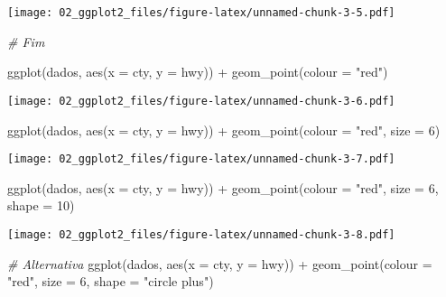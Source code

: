 \documentclass[
]{book}
\newenvironment{Shaded}{\begin{snugshade}}{\end{snugshade}}
\newcommand{\AttributeTok}[1]{\textcolor[rgb]{0.77,0.63,0.00}{#1}}
\newcommand{\CommentTok}[1]{\textcolor[rgb]{0.56,0.35,0.01}{\textit{#1}}}
\newcommand{\DecValTok}[1]{\textcolor[rgb]{0.00,0.00,0.81}{#1}}
\newcommand{\FunctionTok}[1]{\textcolor[rgb]{0.00,0.00,0.00}{#1}}
\newcommand{\NormalTok}[1]{#1}
\newcommand{\SpecialCharTok}[1]{\textcolor[rgb]{0.00,0.00,0.00}{#1}}
\newcommand{\StringTok}[1]{\textcolor[rgb]{0.31,0.60,0.02}{#1}}
\begin{document}
\texttt{[image: 02\_ggplot2\_files/figure-latex/unnamed-chunk-3-5.pdf]}

\begin{Shaded}
\begin{Highlighting}[]
\CommentTok{\# Fim }

\FunctionTok{ggplot}\NormalTok{(dados, }\FunctionTok{aes}\NormalTok{(}\AttributeTok{x =}\NormalTok{ cty, }\AttributeTok{y =}\NormalTok{ hwy)) }\SpecialCharTok{+} 
  \FunctionTok{geom\_point}\NormalTok{(}\AttributeTok{colour =} \StringTok{"red"}\NormalTok{)}
\end{Highlighting}
\end{Shaded}

\texttt{[image: 02\_ggplot2\_files/figure-latex/unnamed-chunk-3-6.pdf]}

\begin{Shaded}
\begin{Highlighting}[]
\FunctionTok{ggplot}\NormalTok{(dados, }\FunctionTok{aes}\NormalTok{(}\AttributeTok{x =}\NormalTok{ cty, }\AttributeTok{y =}\NormalTok{ hwy)) }\SpecialCharTok{+} 
  \FunctionTok{geom\_point}\NormalTok{(}\AttributeTok{colour =} \StringTok{"red"}\NormalTok{, }\AttributeTok{size =} \DecValTok{6}\NormalTok{)}
\end{Highlighting}
\end{Shaded}

\texttt{[image: 02\_ggplot2\_files/figure-latex/unnamed-chunk-3-7.pdf]}

\begin{Shaded}
\begin{Highlighting}[]
\FunctionTok{ggplot}\NormalTok{(dados, }\FunctionTok{aes}\NormalTok{(}\AttributeTok{x =}\NormalTok{ cty, }\AttributeTok{y =}\NormalTok{ hwy)) }\SpecialCharTok{+} 
  \FunctionTok{geom\_point}\NormalTok{(}\AttributeTok{colour =} \StringTok{"red"}\NormalTok{, }\AttributeTok{size =} \DecValTok{6}\NormalTok{, }\AttributeTok{shape =} \DecValTok{10}\NormalTok{)}
\end{Highlighting}
\end{Shaded}

\texttt{[image: 02\_ggplot2\_files/figure-latex/unnamed-chunk-3-8.pdf]}

\begin{Shaded}
\begin{Highlighting}[]
\CommentTok{\# Alternativa}
\FunctionTok{ggplot}\NormalTok{(dados, }\FunctionTok{aes}\NormalTok{(}\AttributeTok{x =}\NormalTok{ cty, }\AttributeTok{y =}\NormalTok{ hwy)) }\SpecialCharTok{+} 
  \FunctionTok{geom\_point}\NormalTok{(}\AttributeTok{colour =} \StringTok{"red"}\NormalTok{, }\AttributeTok{size =} \DecValTok{6}\NormalTok{, }\AttributeTok{shape =} \StringTok{"circle plus"}\NormalTok{)}
\end{Highlighting}
\end{Shaded}
\end{document}
